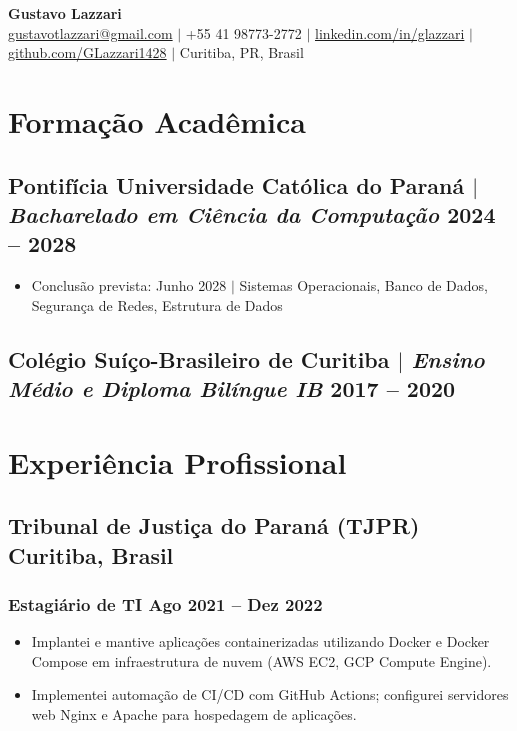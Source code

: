 \documentclass[10pt]{article}
\begin{document}
\begin{center}
	{\LARGE\bfseries Gustavo Lazzari} \\
	\vspace{2pt}
	\href{mailto:gustavotlazzari@gmail.com}{gustavotlazzari@gmail.com} $|$
	+55 41 98773-2772 $|$
	\href{https://www.linkedin.com/in/glazzari}{linkedin.com/in/glazzari} $|$
	\href{https://github.com/GLazzari1428}{github.com/GLazzari1428} $|$
	Curitiba, PR, Brasil
\end{center}

\section{Forma\c{c}\~{a}o Acad\^{e}mica}
\subsection{Pontif\'{i}cia Universidade Cat\'{o}lica do Paran\'{a} $|$ {\normalfont\itshape Bacharelado em Ci\^{e}ncia da Computa\c{c}\~{a}o} \hfill 2024 -- 2028}
\begin{itemize}
	\item Conclus\~{a}o prevista: Junho 2028 $|$ Sistemas Operacionais, Banco de Dados, Seguran\c{c}a de Redes, Estrutura de Dados
\end{itemize}
\subsection{Col\'{e}gio Su\'{i}\c{c}o-Brasileiro de Curitiba $|$ {\normalfont\itshape Ensino M\'{e}dio e Diploma Bil\'{i}ngue IB} \hfill 2017 -- 2020}

\section{Experi\^{e}ncia Profissional}
\subsection{Tribunal de Justi\c{c}a do Paran\'{a} (TJPR) \hfill Curitiba, Brasil}
\subsubsection{Estagi\'{a}rio de TI \hfill Ago 2021 -- Dez 2022}
\begin{itemize}
	\item Implantei e mantive aplica\c{c}\~{o}es containerizadas utilizando Docker e Docker Compose em infraestrutura de nuvem (AWS EC2, GCP Compute Engine).
	\item Implementei automa\c{c}\~{a}o de CI/CD com GitHub Actions; configurei servidores web Nginx e Apache para hospedagem de aplica\c{c}\~{o}es.
\end{itemize}
\end{document}
